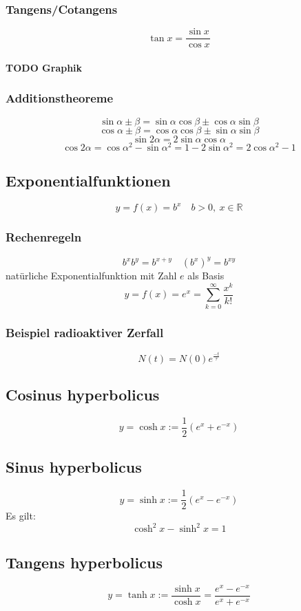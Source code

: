 \documentclass[a4paper]{scrartcl}
\begin{document}
\subsubsection{Tangens/Cotangens}
\label{sec-5-7-3}
\[\tan{x} = \frac{\sin{x}}{\cos{x}}\]
\paragraph{{\bfseries\sffamily TODO} Graphik}
\label{sec-5-7-3-1}
\subsubsection{Additionstheoreme}
\label{sec-5-7-4}
\[\sin{\alpha\pm\beta} = \sin{\alpha}\cos{\beta}\pm\cos{\alpha}\sin{\beta}\]
\[\cos{\alpha\pm\beta} = \cos{\alpha}\cos{\beta}\pm\sin{\alpha}\sin{\beta}\]
\[\sin{2\alpha} = 2\sin{\alpha}\cos{\alpha}\]
\[\cos{2\alpha} = \cos{\alpha}^2 - \sin{\alpha}^2=1 - 2\sin{\alpha}^2 = 2\cos{\alpha}^2 - 1\]
\subsection{Exponentialfunktionen}
\label{sec-5-8}
\[y=f(x)=b^x\quad b>0,~x\in\mathbb{R}\]
\subsubsection{Rechenregeln}
\label{sec-5-8-1}
\[b^x b^y = b^{x+y}\quad \left(b^x\right)^y = b^{xy}\]
natürliche Exponentialfunktion mit Zahl $e$ als Basis
\[y=f(x)=e^x=\sum_{k=0}^\infty \frac{x^k}{k!}\]
\subsubsection{Beispiel radioaktiver Zerfall}
\label{sec-5-8-2}
\[N(t) = N(0)e^\frac{-t}{\tau}\]
\subsection{Cosinus hyperbolicus}
\label{sec-5-9}
\[y=\cosh{x}:=\frac{1}{2}\left(e^x + e^{-x}\right)\]
\subsection{Sinus hyperbolicus}
\label{sec-5-10}
\[y=\sinh{x}:=\frac{1}{2}\left(e^x - e^{-x}\right)\]
Es gilt:
\[\cosh^2{x} - \sinh^2{x}=1\]
\subsection{Tangens hyperbolicus}
\label{sec-5-11}
\[y=\tanh{x}:=\frac{\sinh{x}}{\cosh{x}}=\frac{e^x - e^{-x}}{e^x + e^{-x}}\]
\end{document}

